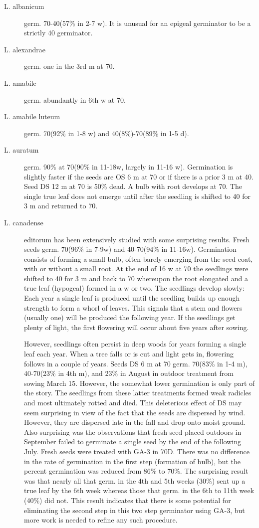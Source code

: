 \begin{description}
\item[L. albanicum] germ. 70-40(57\% in 2-7 w). It is unusual for an epigeal germinator
to be a strictly 40 germinator.
\item[L. alexandrae] germ. one in the 3rd m at 70.
\item[L. amabile] germ. abundantly in 6th w at 70.
\item[L. amabile luteum] germ. 70(92\% in 1-8 w) and 40(8\%)-70(89\% in 1-5 d).
\item[L. auratum] germ. 90\% at 70(90\% in 11-18w, largely in 11-16 w). Germination
is slightly faster if the seeds are OS 6 m at 70 or if there is a prior 3 m at 40. Seed DS
12 m at 70 is 50\% dead. A bulb with root develops at 70. The single true leaf does not
emerge until after the seedling is shifted to 40 for 3 m and returned to 70.

\item[L. canadense] editorum has been extensively studied with some surprising
results. Fresh seeds germ. 70(96\% in 7-9w) and 40-70(94\% in 11-16w).
Germination consists of forming a small bulb, often barely emerging from the seed
coat, with or without a small root. At the end of 16 w at 70 the seedlings were shifted to
40 for 3 m and back to 70 whereupon the root elongated and a true leaf (hypogeal)
formed in a w or two. The seedlings develop slowly: Each year a single leaf is
produced until the seedling builds up enough strength to form a whorl of leaves. This
signals that a stem and flowers (usually one) will be produced the following year. If the
seedlings get plenty of light, the first flowering will occur about five years after sowing.

However, seedlings often persist in deep woods for years forming a single leaf each
year. When a tree falls or is cut and light gets in, flowering follows in a couple of years.
Seeds DS 6 m at 70 germ. 70(83\% in 1-4 m), 40-70(23\% in 4th m), and 23\% in August
in outdoor treatment from sowing March 15. However, the somewhat lower
germination is only part of the story. The seedlings from these latter treatments formed
weak radicles and most ultimately rotted and died. This deleterious effect of DS may
seem surprising in view of the fact that the seeds are dispersed by wind. However,
they are dispersed late in the fall and drop onto moist ground. Also surprising was the
observations that fresh seed placed outdoors in September failed to germinate a
single seed by the end of the following July. Fresh seeds were treated with GA-3 in
70D. There was no difference in the rate of germination in the first step (formation of
bulb), but the percent germination was reduced from 86\% to 70\%. The surprising
result was that nearly all that germ. in the 4th and 5th weeks (30\%) sent up a true leaf
by the 6th week whereas those that germ. in the 6th to 11th week (40\%) did not. This
result indicates that there is some potential for eliminating the second step in this two
step germinator using GA-3, but more work is needed to refine any such procedure.


\end{description}
